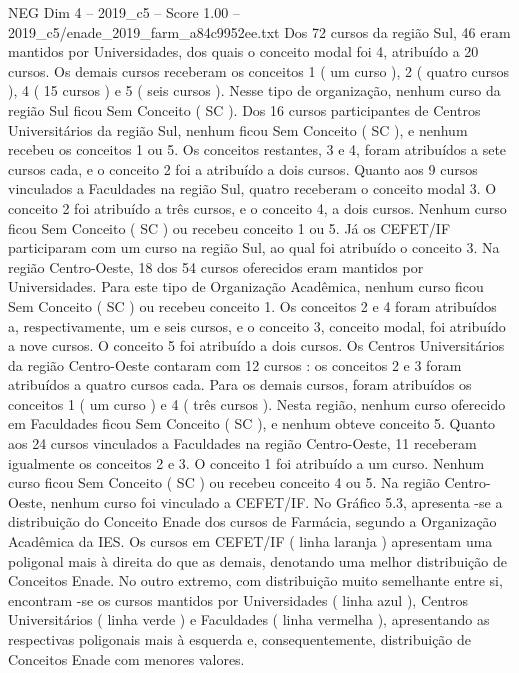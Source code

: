 \begin{textsample}{NEG Dim 4 – 2019\_c5 – Score 1.00 – 2019\_c5/enade\_2019\_farm\_a84c9952ee.txt}
Dos 72 cursos da região Sul, 46 eram mantidos por Universidades, dos quais o conceito modal foi 4, atribuído a 20 cursos.
Os demais cursos receberam os conceitos 1 ( um curso ), 2 ( quatro cursos ), 4 ( 15 cursos ) e 5 ( seis cursos ).
Nesse tipo de organização, nenhum curso da região Sul ficou Sem Conceito ( SC ).
Dos 16 cursos participantes de Centros Universitários da região Sul, nenhum ficou Sem Conceito ( SC ), e nenhum recebeu os conceitos 1 ou 5.
Os conceitos restantes, 3 e 4, foram atribuídos a sete cursos cada, e o conceito 2 foi a atribuído a dois cursos.
Quanto aos 9 cursos vinculados a Faculdades na região Sul, quatro receberam o conceito modal 3.
O conceito 2 foi atribuído a três cursos, e o conceito 4, a dois cursos.
Nenhum curso ficou Sem Conceito ( SC ) ou recebeu conceito 1 ou 5.
Já os CEFET/IF participaram com um curso na região Sul, ao qual foi atribuído o conceito 3.
Na região Centro-Oeste, 18 dos 54 cursos oferecidos eram mantidos por Universidades.
Para este tipo de Organização Acadêmica, nenhum curso ficou Sem Conceito ( SC ) ou recebeu conceito 1.
Os conceitos 2 e 4 foram atribuídos a, respectivamente, um e seis cursos, e o conceito 3, conceito modal, foi atribuído a nove cursos.
O conceito 5 foi atribuído a dois cursos.
Os Centros Universitários da região Centro-Oeste contaram com 12 cursos : os conceitos 2 e 3 foram atribuídos a quatro cursos cada.
Para os demais cursos, foram atribuídos os conceitos 1 ( um curso ) e 4 ( três cursos ).
Nesta região, nenhum curso oferecido em Faculdades ficou Sem Conceito ( SC ), e nenhum obteve conceito 5.
Quanto aos 24 cursos vinculados a Faculdades na região Centro-Oeste, 11 receberam igualmente os conceitos 2 e 3.
O conceito 1 foi atribuído a um curso.
Nenhum curso ficou Sem Conceito ( SC ) ou recebeu conceito 4 ou 5.
Na região Centro-Oeste, nenhum curso foi vinculado a CEFET/IF.
No Gráfico 5.3, apresenta -se a distribuição do Conceito Enade dos cursos de Farmácia, segundo a Organização Acadêmica da IES.
Os cursos em CEFET/IF ( linha laranja ) apresentam uma poligonal mais à direita do que as demais, denotando uma melhor distribuição de Conceitos Enade.
No outro extremo, com distribuição muito semelhante entre si, encontram -se os cursos mantidos por Universidades ( linha azul ), Centros Universitários ( linha verde ) e Faculdades ( linha vermelha ), apresentando as respectivas poligonais mais à esquerda e, consequentemente, distribuição de Conceitos Enade com menores valores.

\end{textsample}
